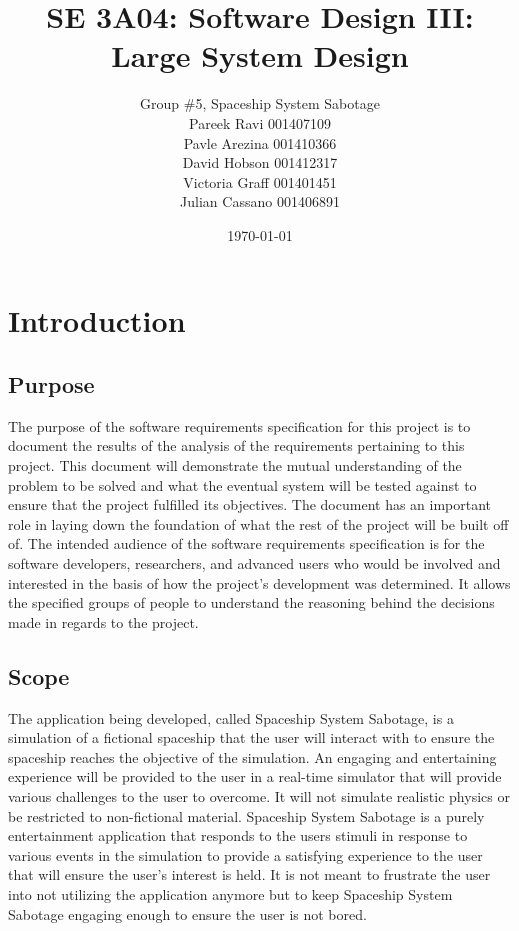 \documentclass[12pt, titlepage]{article}
\title{SE 3A04: Software Design III: Large System Design}
\author{Group \#5, Spaceship System Sabotage %
		\\Pareek Ravi 001407109
		\\Pavle Arezina 001410366
		\\David Hobson 001412317
		\\Victoria Graff 001401451
		\\Julian Cassano 001406891
}
\date{\today}
\newcommand\tab[1][1cm]{\hspace*{#1}}
\begin{document}
\maketitle
{}
\tableofcontents
\listoftables

\newpage
{}

\section{Introduction}
\label{sec:introduction}


\subsection{Purpose}
\label{sub:purpose}
\tab The purpose of the software requirements specification for this project is to document the results of the analysis of the requirements pertaining to this project. This document will demonstrate the mutual understanding of the problem to be solved and what the eventual system will be tested against to ensure that the project fulfilled its objectives. The document has an important role in laying down the foundation of what the rest of the project will be built off of. The intended audience of the software requirements specification is for the software developers, researchers, and advanced users who would be involved and interested in the basis of how the project's development was determined. It allows the specified groups of people to understand the reasoning behind the decisions made in regards to the project.

\subsection{Scope}
\label{sub:scope}
\tab The application being developed, called Spaceship System Sabotage, is a simulation of a fictional spaceship that the user will interact with to ensure the spaceship reaches the objective of the simulation. An engaging and entertaining experience will be provided to the user in a real-time simulator that will provide various challenges to the user to overcome. It will not simulate realistic physics or be restricted to non-fictional material. Spaceship System Sabotage is a purely entertainment application that responds to the users stimuli in response to various events in the simulation to provide a satisfying experience to the user that will ensure the user's interest is held. It is not meant to frustrate the user into not utilizing the application anymore but to keep Spaceship System Sabotage engaging enough to ensure the user is not bored.
\end{document}
